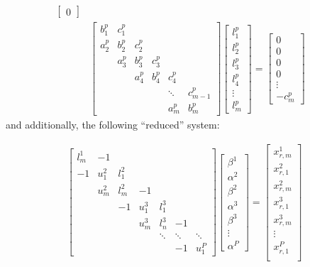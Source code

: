 \documentclass{elsarticle}
\begin{document}
\begin{align}
\begin{bmatrix}
0
\end{bmatrix} & \label{eqn:secondary-system-1} \\
%
%
%
& \begin{bmatrix}
b_1^p & c_1^p \\
a_2^p & b_2^p & c_2^p \\
      & a_3^p & b_3^p & c_3^p \\
      &       & a_4^p & b_4^p & c_4^p \\
      &       &       &       &  \ddots & c_{m-1}^p\\
      &       &       &       &     a_{m}^p  & b_{m}^p
\end{bmatrix}
\begin{bmatrix}
l_1^p \\
l_2^p \\
l_3^p \\
l_4^p \\
\vdots \\
l_m^p
\end{bmatrix}
=
\begin{bmatrix}
0 \\
0 \\
0 \\
0 \\
\vdots \\
-c_m^p
\end{bmatrix} & \label{eqn:secondary-system-2}
\end{align}
%
and additionally, the following ``reduced'' system:

\begin{align} \label{eqn:reduced-system}
&
\begin{bmatrix}
l^1_m & -1 \\
-1    & u^2_1 & l^2_1 \\
      & u^2_m & l^2_m & -1 \\
      &       & -1    & u^3_1 & l^3_1 \\
      &       &       & u^3_m & l^3_n  & -1 \\
      &       &       &       & \ddots & \ddots & \ddots \\
      &       &       &       &        & -1     & u^P_1
\end{bmatrix}
\begin{bmatrix}
\beta^1 \\
\alpha^2 \\
\beta^2 \\
\alpha^3 \\
\beta^3 \\
\vdots \\
\alpha^P
\end{bmatrix}
=
\begin{bmatrix}
x_{r,m}^1 \\
x_{r,1}^2 \\
x_{r,m}^2 \\
x_{r,1}^3 \\
x_{r,m}^3 \\
\vdots \\
x_{r,1}^P \\
\end{bmatrix}
&
\end{align}
\end{document}
